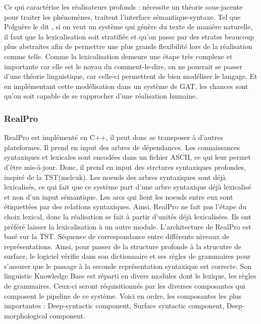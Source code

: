 Ce qui caractérise les réalisateurs profonds : nécessite un théorie sous-jacente pour traiter les phénomènes, traitent l'interface sémantique-syntaxe. Tel que Polguère le dit \citep{PolguerePourmodelestratifie}, si on veut un système qui génère du texte de manière naturelle, il faut que la lexicalisation soit stratifiée et qu'on passe par des strates beaucoup plus abstraites afin de permettre une plus grande flexibilité lors de la réalisation comme telle. Comme la lexicalisation demeure une étape très complexe et importante car elle est le noyau du comment-le-dire, on ne pourrait se passer d'une théorie linguistique, car celle-ci permettent de bien modéliser le langage. Et en implémentant cette modélisation dans un système de \ac{GAT}, les chances sont qu'on soit capable de se rapprocher d'une réalisation humaine.

\subsubsection{RealPro}
\citep{LavoieFastPortableRealizer1997}
RealPro est implémenté en C++, il peut donc se transposer à d'autres plateformes. Il prend en input des arbres de dépendances. Les connaissances syntaxiques et lexicales sont encodées dans un fichier ASCII, ce qui leur permet d'être mis-à-jour. Donc, il prend en input des strctures syntaxiques profondes, inspiré de la TST(melcuk). Les noeuds des arbres syntaxiques sont déjà lexicalisés, ce qui fait que ce système part d'une arbre syntaxique déjà lexicalisé et non d'un input sémantique. Les arcs qui lient les noeuds entre eux sont étiquettées par des relations syntaxiques. Ainsi, RealPro ne fait pas l'étape du choix lexical, donc la réalisation se fait à partir d'unités déjà lexicalisées. Ils ont préféré laisser la lexicalisation à un autre module. L'architecture de RealPro est basé sur la TST. Séquence de correspondance entre différents niveaux de représentations. Ainsi, pour passer de la structure profonde à la strucutre de surface, le logiciel vérifie dans son dictionnaire et ses règles de grammaires pour s'assurer que le passage à la seconde représentation syntaxique est correcte. Son linguistic Knowledge Base est réparti en divers modules dont  le lexique, les règles de grammaires. Ceux-ci seront réquisitionnés par les diverses composantes qui composent le pipeline de ce système. Voici en ordre, les composantes les plus importantes : Deep-syntactic component, Surface syntactic component, Deep-morphological component.

